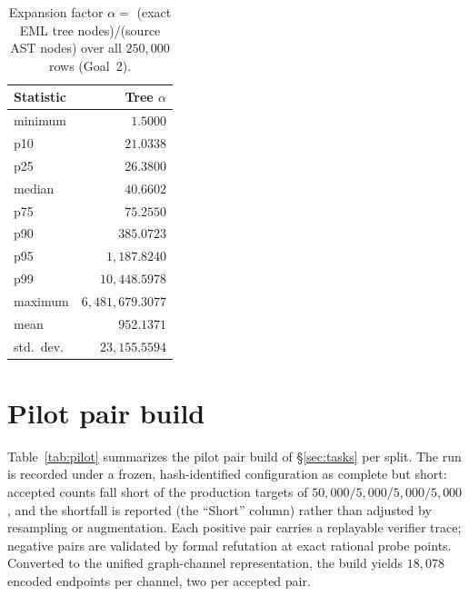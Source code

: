 \documentclass[11pt]{article}
\begin{document}
\begin{table}[h]
\centering
\small
\renewcommand{\arraystretch}{1.1}
\begin{tabular}{@{}lr@{}}
\toprule
\textbf{Statistic} & \textbf{Tree} $\alpha$ \\
\midrule
minimum & $1.5000$ \\
p10 & $21.0338$ \\
p25 & $26.3800$ \\
median & $40.6602$ \\
p75 & $75.2550$ \\
p90 & $385.0723$ \\
p95 & $1{,}187.8240$ \\
p99 & $10{,}448.5978$ \\
maximum & $6{,}481{,}679.3077$ \\
mean & $952.1371$ \\
std.\ dev. & $23{,}155.5594$ \\
\bottomrule
\end{tabular}
\caption{Expansion factor $\alpha=$ (exact EML tree nodes)/(source AST nodes) over
all $250{,}000$ rows (Goal~2).}
\label{tab:dist}
\end{table}

\section{Pilot pair build}
\label{app:pilot}
Table~\ref{tab:pilot} summarizes the pilot pair build of \S\ref{sec:tasks} per
split. The run is recorded under a frozen, hash-identified configuration as
complete but short: accepted counts fall short of the
production targets of $50{,}000/5{,}000/5{,}000/5{,}000$, and the shortfall is
reported (the ``Short'' column) rather than adjusted by resampling or
augmentation. Each positive pair carries a replayable verifier trace; negative
pairs are validated by formal refutation at exact rational probe points.
Converted to the unified graph-channel representation, the build yields
$18{,}078$ encoded endpoints per channel, two per accepted pair.
\end{document}
